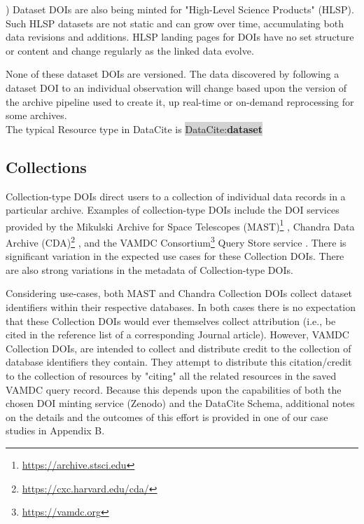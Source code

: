 \documentclass[11pt,a4paper]{ivoa}
\newcommand{\dataciteterm}[1]{\colorbox{lightgray}{DataCite:\textbf{#1}}}
\begin{document}
)
Dataset DOIs are also being minted for "High-Level Science Products" (HLSP). 
Such HLSP datasets are not static and can grow over time, accumulating both data revisions and additions.
HLSP landing pages for DOIs have no set structure or content and change regularly as the linked data evolve.

None of these dataset DOIs are versioned. 
The data discovered by following a dataset DOI to an individual observation will change based upon the version of the archive pipeline used to create it, up real-time or on-demand reprocessing for some archives.\\

The typical Resource type in DataCite is \dataciteterm{dataset}

\subsection{Collections}
\label{sec:intro:collections}


Collection-type DOIs direct users to a collection of individual data records in a particular archive.
Examples of collection-type DOIs include the DOI services provided by the Mikulski Archive for Space Telescopes (MAST)\footnote{\url{https://archive.stsci.edu}} \citep{2018ApJS..236...20N}, Chandra Data Archive (CDA)\footnote{\url{https://cxc.harvard.edu/cda/}} \citep{2018EPJWC.18612011R}, and the VAMDC Consortium\footnote{\url{https://vamdc.org}} Query Store service \citep{2018Galax...6..105M}.  
There is significant variation in the expected use cases for these Collection DOIs. 
There are also strong variations in the metadata of Collection-type DOIs.

Considering use-cases, both MAST and Chandra Collection DOIs collect dataset identifiers within their respective databases.
In both cases there is no expectation that these Collection DOIs would ever themselves collect attribution (i.e., be cited in the reference list of a corresponding Journal article).
However, VAMDC Collection DOIs, are intended to collect and distribute credit to the collection of database identifiers they contain.
They attempt to distribute this citation/credit to the collection of resources by "citing" all the related resources in the saved VAMDC query record.
Because this depends upon the capabilities of both the chosen DOI minting service (Zenodo) and the DataCite Schema, additional notes on the details and the outcomes of this effort is provided in one of our case studies in Appendix B. 
\end{document}
